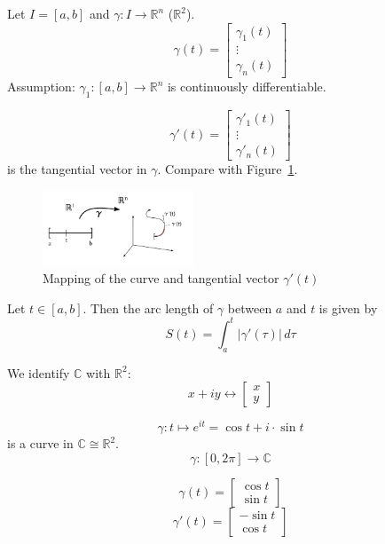 \documentclass[a4paper,landscape,twocolumn]{article}
\theoremstyle{definition}
\newcommand\abs[1]{\left|#1\right|}
\begin{document}
Let $I = [a,b]$ and $\gamma: I \to \mathbb R^n$ ($\mathbb R^2$).
\[ \gamma(t) = \begin{bmatrix} \gamma_1(t) \\ \vdots \\ \gamma_n(t) \end{bmatrix} \]
Assumption: $\gamma_1: [a,b] \to \mathbb R^n$ is continuously differentiable.

\[ \gamma'(t) = \begin{bmatrix} \gamma'_1(t) \\ \vdots \\ \gamma'_n(t) \end{bmatrix} \]
is the tangential vector in $\gamma$. Compare with Figure~\ref{img:tangentialvector}.

\begin{figure}[!h]
  \begin{center}
    \includegraphics[width=0.4\textwidth]{img/curve_mapped.pdf}
    \caption{Mapping of the curve and tangential vector $\gamma'(t)$}
    \label{img:tangentialvector}
  \end{center}
\end{figure}

Let $t \in [a,b]$. Then the arc length of $\gamma$ between $a$ and $t$
is given by
\[ S(t) = \int_a^t \abs{\gamma'(\tau)} \, d\tau \]

We identify $\mathbb C$ with $\mathbb R^2$:
\[ x + iy \leftrightarrow \begin{bmatrix} x \\ y \end{bmatrix} \]

\[ \gamma: t \mapsto e^{it} = \cos{t} + i \cdot \sin{t} \]
is a curve in $\mathbb C \cong \mathbb R^2$.
\[ \gamma: [0,2\pi] \to \mathbb C \]

\[ \gamma(t) = \begin{bmatrix} \cos{t} \\ \sin{t} \end{bmatrix} \]
\[ \gamma'(t) = \begin{bmatrix} -\sin{t} \\ \cos{t} \end{bmatrix} \]
\end{document}
